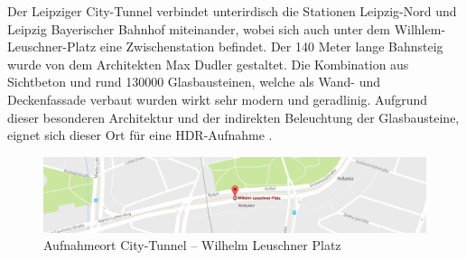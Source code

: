 \documentclass[liststotoc,bibtotoc,fontsize=14pt,]{scrreprt}
\begin{document}
	\bigskip
	Der Leipziger City-Tunnel verbindet unterirdisch die Stationen Leipzig-Nord und Leipzig Bayerischer Bahnhof miteinander, wobei sich auch unter dem Wilhlem-Leuschner-Platz eine Zwischenstation befindet. Der 140 Meter lange Bahnsteig wurde von dem Architekten Max Dudler  gestaltet. Die Kombination aus Sichtbeton und rund 130000 Glasbausteinen, welche als Wand- und Deckenfassade verbaut wurden wirkt sehr modern und geradlinig. Aufgrund dieser besonderen Architektur und der indirekten Beleuchtung der Glasbausteine, eignet sich dieser Ort für eine HDR-Aufnahme
	.
\begin{figure}[H]
	\includegraphics[width=\linewidth]{img/places/leuscher_map.jpg}
	\caption{Aufnahmeort City-Tunnel -- Wilhelm Leuschner Platz}
	\label{img:ak_map}
\end{figure}
\end{document}
